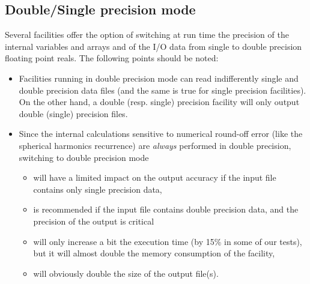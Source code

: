 \documentclass[12pt,twoside]{article}
\begin{document}
\subsection{Double/Single precision mode}
\label{fac:subsec:ioprec}
Several facilities offer the option of switching at run time 
the precision of the internal variables and arrays and of the I/O data from single to double precision
floating point reals. The following points should be noted: \label{page:ioprec}
\begin{itemize}
\item Facilities running in double precision mode can read indifferently single and double
  precision data files (and the same is true for single precision facilities). On
  the other hand, a double (resp. single) precision facility will only output double
  (single) precision  files.
\item Since the internal calculations sensitive to numerical round-off error
  (like the spherical harmonics recurrence) are
  {\em always} performed in double precision, switching to double precision mode
\begin{itemize}
\item   will have a limited impact on the output accuracy if the input file contains only
  single precision data,
\item is recommended if the input file contains double precision data, and the precision of the output is critical
\item will only increase a bit the execution time (by 15\% in some of our tests), but
  it will almost double the memory consumption of the facility,
\item will obviously double the size of the output file(s).
\end{itemize}
\end{itemize}

\end{document}
